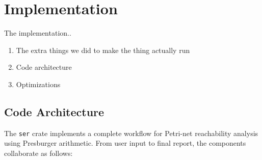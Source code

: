 

\section{Implementation}
\label{sec:implementation}


The implementation..

\begin{enumerate}
	\item The extra things we did to make the thing actually run
	\item Code architecture
	\item Optimizations
\end{enumerate}



\subsection{Code Architecture}

\label{subsec:codeArchitecture}

The \texttt{ser} crate implements a complete workflow for Petri-net reachability analysis using Presburger arithmetic. From user input to final report, the components collaborate as follows:

